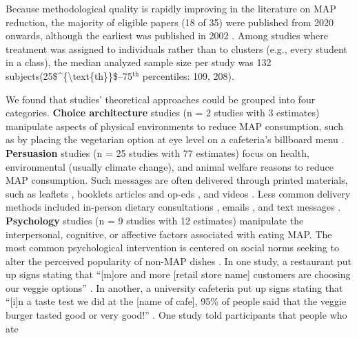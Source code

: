 \documentclass[sn-nature,referee,pdflatex]{sn-jnl}
\begin{document}
Because methodological quality is rapidly improving in the literature on
MAP reduction, the majority of eligible papers (18 of 35) were published
from 2020 onwards, although the earliest was published in 2002
\citep{allen2002}. Among studies where treatment was assigned to
individuals rather than to clusters (e.g., every student in a class),
the median analyzed sample size per study was 132
subjects(25\$\^{}\{\textbackslash text\{th\}\}\$--75\(^{\text{th}}\)
percentiles: 109, 208).

We found that studies' theoretical approaches could be grouped into four
categories. \textbf{Choice architecture} studies
\citep{andersson2021, kanchanachitra2020} (n = 2 studies with 3
estimates) manipulate aspects of physical environments to reduce MAP
consumption, such as by placing the vegetarian option at eye level on a
cafeteria's billboard menu \citep{andersson2021}. \textbf{Persuasion}
studies
\citep{kanchanachitra2020, aberman2018, abrahamse2007, acharya2004, banerjee2019, bianchi2022, bochmann2017, bschaden2020, carfora2023, hennessy2016, piester2020, cooney2014, cooney2016, feltz2022, haile2021, hatami2018, jalil2023, mathur2021effectiveness, merrill2009, norris2014, peacock2017, polanco2022, sparkman2021, weingarten2022}
(n = 25 studies with 77 estimates) focus on health, environmental
(usually climate change), and animal welfare reasons to reduce MAP
consumption. Such messages are often delivered through printed
materials, such as leaflets \citep{haile2021, polanco2022}, booklets
\citep{bianchi2022} articles and op-eds \citep{sparkman2021, feltz2022},
and videos \citep{sparkman2021, cooney2016, mathur2021effectiveness}.
Less common delivery methods included in-person dietary consultations
\citep{merrill2009}, emails \citep{banerjee2019}, and text messages
\citep{carfora2023}. \textbf{Psychology} studies
\citep{aldoh2023, allen2002, camp2019, coker2022, piester2020, sparkman2020}
(n = 9 studies with 12 estimates) manipulate the interpersonal,
cognitive, or affective factors associated with eating MAP. The most
common psychological intervention is centered on social norms seeking to
alter the perceived popularity of non-MAP dishes \citep{sparkman2020}.
In one study, a restaurant put up signs stating that ``{[}m{]}ore and
more {[}retail store name{]} customers are choosing our veggie options''
\citep{coker2022}. In another, a university cafeteria put up signs
stating that ``{[}i{]}n a taste test we did at the {[}name of cafe{]},
95\% of people said that the veggie burger tasted good or very good!''
\citep{piester2020}. One study told participants that people who ate
\end{document}
